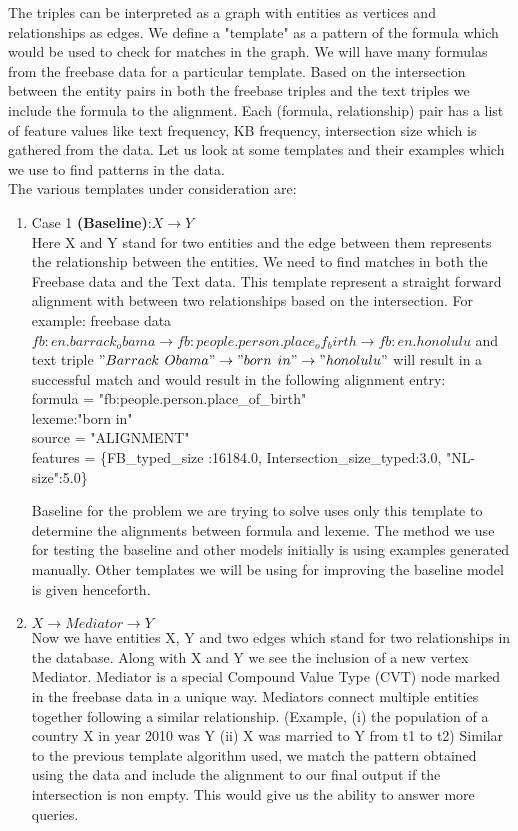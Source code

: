 \documentclass[12pt, a4paper]{article}
\begin{document}
The triples can be interpreted as a graph with entities as vertices and relationships as edges. We define a "template" as a pattern of the formula which would be used to check for matches in the graph. We will have many formulas from the freebase data for a particular template. Based on the intersection between the entity pairs in both the freebase triples and the text triples we include the formula to the alignment. Each (formula, relationship) pair has a list of feature values like text frequency, KB frequency, intersection size which is gathered from the data. Let us look at some templates and their examples which we use to find patterns in the data.\\

The various templates under consideration are:
\begin{enumerate}
	\item Case 1 {\bf (Baseline)}:$X\rightarrow Y$\\
	Here X and Y stand for two entities and the edge between them represents the relationship between the entities. We need to find matches in both the Freebase data and the Text data. This template represent a straight forward alignment with between two relationships based on the intersection. For example: freebase data $fb:en.barrack_obama \rightarrow	fb:people.person.place_of_birth \rightarrow	fb:en.honolulu$ and text triple $"Barrack$ $Obama" \rightarrow "born$ $in" \rightarrow "honolulu"$ will result in a successful match and would result in the following alignment entry:\\
	
formula = "fb:people.person.place\_of\_birth"\\
lexeme:"born in"\\
source = "ALIGNMENT"\\
features = \{FB\_typed\_size :16184.0, Intersection\_size\_typed:3.0, "NL-size":5.0\}

Baseline for the problem we are trying to solve uses only this template to determine the alignments between formula and lexeme. The method we use for testing the baseline and other models initially is using examples generated manually. Other templates we will be using for improving the baseline model is given henceforth.

 
	\item $X\rightarrow Mediator \rightarrow Y$\\
	Now we have entities X, Y and two edges which stand for two relationships in the database. Along with X and Y we see the inclusion of a new vertex Mediator. Mediator is a special Compound Value Type (CVT) node marked in the freebase data in a unique way. Mediators connect multiple entities together following a similar relationship. (Example, (i) the population of a country X in year 2010 was Y (ii) X was married to Y from t1 to t2) Similar to the previous template algorithm used, we match the pattern obtained using the data and include the alignment to our final output if the intersection is non empty. This would give us the ability to answer more queries. 
	

\end{enumerate}
\end{document}
